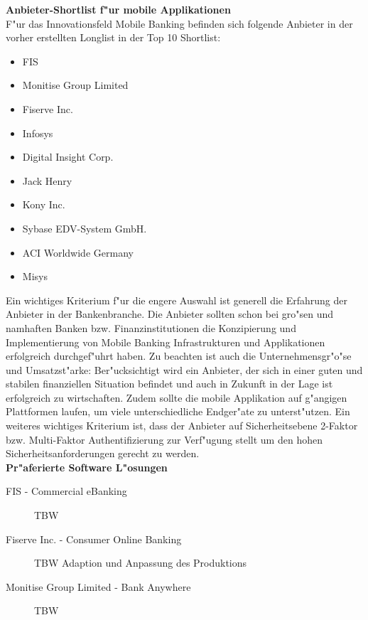 \textbf{Anbieter-Shortlist f"ur mobile Applikationen}\\
F"ur das Innovationsfeld Mobile Banking befinden sich folgende Anbieter in der vorher erstellten Longlist in der Top 10 Shortlist:

\begin{itemize}
	\item FIS
	\item Monitise Group Limited
	\item Fiserve Inc.
	\item Infosys
	\item Digital Insight Corp.
	\item Jack Henry
	\item Kony Inc.
	\item Sybase EDV-System GmbH.
	\item ACI Worldwide Germany
	\item Misys
\end{itemize}

Ein wichtiges Kriterium f"ur die engere Auswahl ist generell die Erfahrung der Anbieter in der Bankenbranche. Die Anbieter sollten schon bei gro"sen und namhaften Banken bzw. Finanzinstitutionen die Konzipierung und Implementierung von Mobile Banking Infrastrukturen und Applikationen erfolgreich durchgef"uhrt haben. Zu beachten ist auch die Unternehmensgr"o"se und Umsatzst"arke: Ber"ucksichtigt wird ein Anbieter, der sich in einer guten und stabilen finanziellen Situation befindet und auch in Zukunft in der Lage ist erfolgreich zu wirtschaften. Zudem sollte die mobile Applikation auf g"angigen Plattformen laufen, um viele unterschiedliche Endger"ate zu unterst"utzen. Ein weiteres wichtiges Kriterium ist, dass der Anbieter auf Sicherheitsebene 2-Faktor bzw. Multi-Faktor Authentifizierung zur Verf"ugung stellt um den hohen Sicherheitsanforderungen gerecht zu werden.\\

\textbf{Pr"aferierte Software L"osungen}
\begin{description}

	\item[FIS - Commercial eBanking]   TBW
	
	\item[Fiserve Inc. - Consumer Online Banking]   TBW Adaption und Anpassung des Produktions 
	
	\item[Monitise Group Limited - Bank Anywhere]   TBW
	
\end{description}